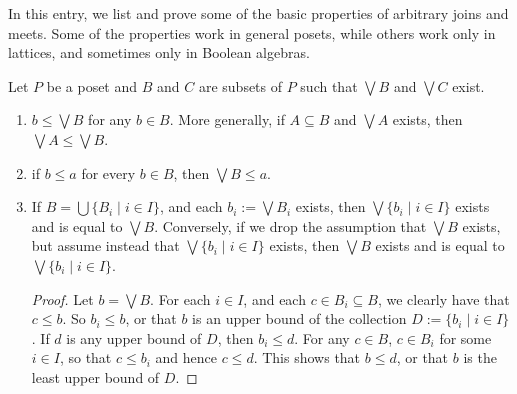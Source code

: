 \documentclass[12pt]{article}
\begin{document}
In this entry, we list and prove some of the basic properties of arbitrary joins and meets.  Some of the properties work in general posets, while others work only in lattices, and sometimes only in Boolean algebras.

Let $P$ be a poset and $B$ and $C$ are subsets of $P$ such that $\bigvee B$ and $\bigvee C$ exist. 

\begin{enumerate}
\item $b\le \bigvee B$ for any $b\in B$.  More generally, if $A\subseteq B$ and $\bigvee A$ exists, then $\bigvee A\le \bigvee B$.
\item if $b\le a$ for every $b\in B$, then $\bigvee B\le a$.
\item If $B=\bigcup \lbrace B_i\mid i\in I\rbrace$, and each $b_i:=\bigvee B_i$ exists, then $\bigvee \lbrace b_i\mid i\in I\rbrace$ exists and is equal to $\bigvee B$.  Conversely, if we drop the assumption that $\bigvee B$ exists, but assume instead that $\bigvee \lbrace b_i\mid i\in I\rbrace$ exists, then $\bigvee B$ exists and is equal to $\bigvee \lbrace b_i\mid i\in I\rbrace$.
\begin{proof}
Let $b=\bigvee B$.  For each $i\in I$, and each $c\in B_i\subseteq B$, we clearly have that $c\le b$.  So $b_i\le b$, or that $b$ is an upper bound of the collection $D:=\lbrace b_i\mid i\in I\rbrace$.  If $d$ is any upper bound of $D$, then $b_i\le d$.  For any $c\in B$, $c\in B_i$ for some $i\in I$, so that $c\le b_i$ and hence $c\le d$.  This shows that $b\le d$, or that $b$ is the least upper bound of $D$.


\end{proof}
\end{enumerate}
\end{document}
